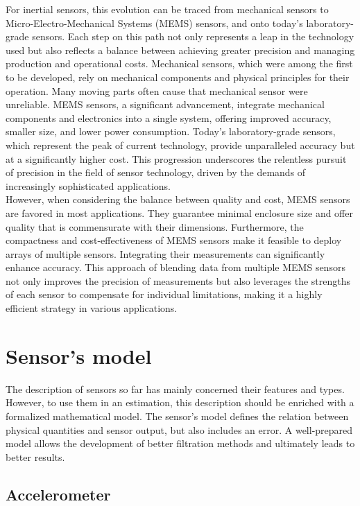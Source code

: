 For inertial sensors, this evolution can be traced from mechanical sensors to Micro-Electro-Mechanical Systems (MEMS) sensors, and onto today’s laboratory-grade sensors. Each step on this path not only represents a leap in the technology used but also reflects a balance between achieving greater precision and managing production and operational costs. Mechanical sensors, which were among the first to be developed, rely on mechanical components and physical principles for their operation. Many moving parts often cause that mechanical sensor were unreliable. MEMS sensors, a significant advancement, integrate mechanical components and electronics into a single system, offering improved accuracy, smaller size, and lower power consumption. Today's laboratory-grade sensors, which represent the peak of current technology, provide unparalleled accuracy but at a significantly higher cost. This progression underscores the relentless pursuit of precision in the field of sensor technology, driven by the demands of increasingly sophisticated applications.\\

However, when considering the balance between quality and cost, MEMS sensors are favored in most applications. They guarantee minimal enclosure size and offer quality that is commensurate with their dimensions. Furthermore, the compactness and cost-effectiveness of MEMS sensors make it feasible to deploy arrays of multiple sensors. Integrating their measurements can significantly enhance accuracy. This approach of blending data from multiple MEMS sensors not only improves the precision of measurements but also leverages the strengths of each sensor to compensate for individual limitations, making it a highly efficient strategy in various applications.

\section{Sensor's model}

The description of sensors so far has mainly concerned their features and types. However, to use them in an estimation, this description should be enriched with a formalized mathematical model. The sensor's model defines the relation between physical quantities and sensor output, but also includes an error. A well-prepared model allows the development of better filtration methods and ultimately leads to better results.

\subsection{Accelerometer}

